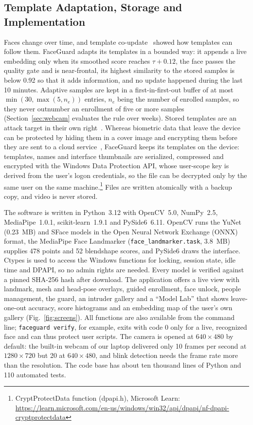 \documentclass[journal]{IEEEtran}
\newcommand{\sys}{FaceGuard}
\begin{document}
\subsection{Template Adaptation, Storage and Implementation}\label{sec:adaptive}
Faces change over time, and template co-update~\cite{rattani2008coupdate} showed how templates can follow them. \sys{} adapts its templates in a bounded way: it appends a live embedding only when its smoothed score reaches $\tau+0.12$, the face passes the quality gate and is near-frontal, its highest similarity to the stored samples is below 0.92 so that it adds information, and no update happened during the last 10 minutes. Adaptive samples are kept in a first-in-first-out buffer of at most $\min(30,\max(5,n_e))$ entries, $n_e$ being the number of enrolled samples, so they never outnumber an enrollment of five or more samples (Section~\ref{sec:webcam} evaluates the rule over weeks). Stored templates are an attack target in their own right~\cite{ratha2001enhancing}. Whereas biometric data that leave the device can be protected by hiding them in a cover image and encrypting them before they are sent to a cloud service~\cite{prabhu2022stego}, \sys{} keeps its templates on the device: templates, names and interface thumbnails are serialized, compressed and encrypted with the Windows Data Protection API, whose user-scope key is derived from the user's logon credentials, so the file can be decrypted only by the same user on the same machine.\footnote{CryptProtectData function (dpapi.h), Microsoft Learn: \url{https://learn.microsoft.com/en-us/windows/win32/api/dpapi/nf-dpapi-cryptprotectdata}} Files are written atomically with a backup copy, and video is never stored.

The software is written in Python~3.12 with OpenCV~5.0, NumPy~2.5, MediaPipe~1.0.1, scikit-learn~1.9.1 and PySide6~6.11. OpenCV runs the YuNet (0.23~MB) and SFace models in the Open Neural Network Exchange (ONNX) format, the MediaPipe Face Landmarker (\texttt{face\_landmarker.task}, 3.8~MB) supplies 478 points and 52 blendshape scores, and PySide6 draws the interface. Ctypes is used to access the Windows functions for locking, session state, idle time and DPAPI, so no admin rights are needed. Every model is verified against a pinned SHA-256 hash after download. The application offers a live view with landmark, mesh and head-pose overlays, guided enrollment, face unlock, people management, the guard, an intruder gallery and a ``Model Lab'' that shows leave-one-out accuracy, score histograms and an embedding map of the user's own gallery (Fig.~\ref{fig:screens}). All functions are also available from the command line; \texttt{faceguard verify}, for example, exits with code 0 only for a live, recognized face and can thus protect user scripts. The camera is opened at $640\times480$ by default: the built-in webcam of our laptop delivered only 10 frames per second at $1280\times720$ but 20 at $640\times480$, and blink detection needs the frame rate more than the resolution. The code base has about ten thousand lines of Python and 110 automated tests.
\end{document}
